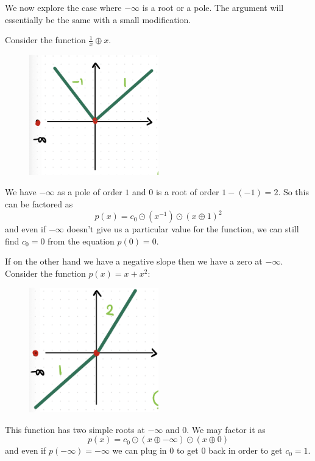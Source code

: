 \documentclass[12pt]{memoir}
\begin{document}
\begin{Ex}
    We now explore the case where $-\infty$ is a root or a pole. The argument will essentially be the same with a small modification.\par 
    Consider the function $\frac{1}{x}\oplus x$.
    \begin{figure}[h!]
        \centering
        \includegraphics[width=0.5\textwidth]{figs/fig4-2RootAndPoleProof.png}
        \label{fig:4.2-RootAndPoleProof}
    \end{figure}
    We have $-\infty$ as a pole of order $1$ and $0$ is a root of order $1-(-1)=2$. So this can be factored as 
    $$p(x)=c_0\odot(x^{-1})\odot(x\oplus 1)^2$$
    and even if $-\infty$ doesn't give us a particular value for the function, we can still find $c_0=0$ from the equation $p(0)=0$.\par 
    If on the other hand we have a negative slope then we have a zero at $-\infty$. Consider the function $p(x)=x+x^2$:
    \begin{figure}[h!]
        \centering
        \includegraphics[width=0.5\textwidth]{figs/fig4-3RootsForProof.png}
        \label{fig:4.3-RootsForProof}
    \end{figure}
    This function has two simple roots at $-\infty$ and $0$. We may factor it as 
    $$p(x)=c_0\odot(x\oplus-\infty)\odot(x\oplus 0)$$
    and even if $p(-\infty)=-\infty$ we can plug in $0$ to get $0$ back in order to get $c_0=1$.
\end{Ex}
\end{document}
